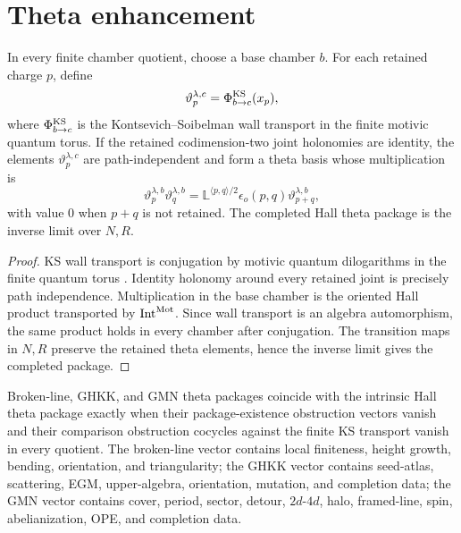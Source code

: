\section{Theta enhancement}

\begin{theorem}
\label{thm:bps-positive-hall-theta}
In every finite chamber quotient, choose a base chamber \(b\). For
each retained charge \(p\), define
\[
\vartheta^{\lambda,c}_p
=
\Phi^{\mathrm{KS}}_{b\to c}(x_p),
\]
where \(\Phi^{\mathrm{KS}}_{b\to c}\) is the Kontsevich--Soibelman wall
transport in the finite motivic quantum torus. If the retained
codimension-two joint holonomies are identity, the elements
\(\vartheta^{\lambda,c}_p\) are path-independent and form a theta basis
whose multiplication is
\[
\vartheta^{\lambda,b}_p\vartheta^{\lambda,b}_q
=
\mathbb L^{\langle p,q\rangle/2}
\epsilon_o(p,q)\vartheta^{\lambda,b}_{p+q},
\]
with value \(0\) when \(p+q\) is not retained. The completed Hall theta
package is the inverse limit over \(N,R\).
\end{theorem}

\begin{proof}
KS wall transport is conjugation by motivic quantum dilogarithms in the
finite quantum torus \cite{KS2008}. Identity holonomy around every
retained joint is precisely path independence. Multiplication in the
base chamber is the oriented Hall product transported by
\(\mathrm{Int}^{\mathrm{Mot}}\). Since wall transport is an algebra automorphism, the
same product holds in every chamber after conjugation. The transition
maps in \(N,R\) preserve the retained theta elements, hence the inverse
limit gives the completed package.
\end{proof}

\begin{corollary}
\label{cor:bps-positive-theta-comparison}
Broken-line, GHKK, and GMN theta packages coincide with the intrinsic
Hall theta package exactly when their package-existence obstruction
vectors vanish and their comparison obstruction cocycles against the
finite KS transport vanish in every quotient. The broken-line vector
contains local finiteness, height growth, bending, orientation, and
triangularity; the GHKK vector contains seed-atlas, scattering, EGM,
upper-algebra, orientation, mutation, and completion data; the GMN
vector contains cover, period, sector, detour, \(2d\)-\(4d\), halo,
framed-line, spin, abelianization, OPE, and completion data.
\end{corollary}

